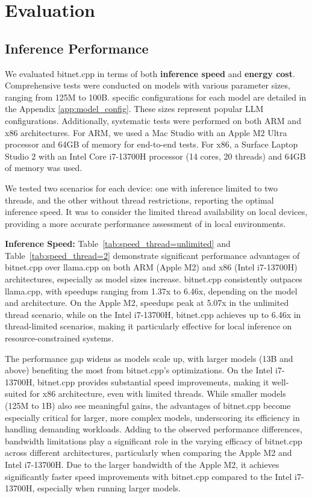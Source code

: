 \documentclass{article}
\newcommand\bitnet{\text{BitNet b1.58}}
\begin{document}
\section{Evaluation}
\subsection{Inference Performance}
We evaluated bitnet.cpp in terms of both \textbf{inference speed} and \textbf{energy cost}. Comprehensive tests were conducted on models with various parameter sizes, ranging from 125M to 100B. specific configurations for each model are detailed in the Appendix \ref{app:model_config}. These sizes represent popular LLM configurations. Additionally, systematic tests were performed on both ARM and x86 architectures. For ARM, we used a Mac Studio with an Apple M2 Ultra processor and 64GB of memory for end-to-end tests. For x86, a Surface Laptop Studio 2 with an Intel Core i7-13700H processor (14 cores, 20 threads) and 64GB of memory was used. 

We tested two scenarios for each device: one with inference limited to two threads, and the other without thread restrictions, reporting the optimal inference speed. It was to consider the limited thread availability on local devices, providing a more accurate performance assessment of \bitnet{} in local environments.

\textbf{Inference Speed:} Table~\ref{tab:speed_thread=unlimited} and Table~\ref{tab:speed_thread=2} demonstrate significant performance advantages of bitnet.cpp over llama.cpp on both ARM (Apple M2) and x86 (Intel i7-13700H) architectures, especially as model sizes increase. bitnet.cpp consistently outpaces llama.cpp, with speedups ranging from 1.37x to 6.46x, depending on the model and architecture. On the Apple M2, speedups peak at 5.07x in the unlimited thread scenario, while on the Intel i7-13700H, bitnet.cpp achieves up to 6.46x in thread-limited scenarios, making it particularly effective for local inference on resource-constrained systems.

The performance gap widens as models scale up, with larger models (13B and above) benefiting the most from bitnet.cpp's optimizations. On the Intel i7-13700H, bitnet.cpp provides substantial speed improvements, making it well-suited for x86 architecture, even with limited threads. While smaller models (125M to 1B) also see meaningful gains, the advantages of bitnet.cpp become especially critical for larger, more complex models, underscoring its efficiency in handling demanding workloads. Adding to the observed performance differences, bandwidth limitations play a significant role in the varying efficacy of bitnet.cpp across different architectures, particularly when comparing the Apple M2 and Intel i7-13700H. Due to the larger bandwidth of the Apple M2, it achieves significantly faster speed improvements with bitnet.cpp compared to the Intel i7-13700H, especially when running larger models.
\end{document}
